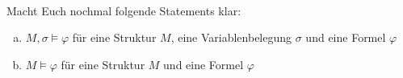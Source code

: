 \newcommand{\printpraesenzlsg}{false}
\newcommand{\printloesungen}{false}
\newcommand{\printbewertungen}{false}
\newcommand{\blattnummer}{3}



\iforiginal{}

	

\\
Macht Euch nochmal folgende Statements klar:
\begin{enumerate}[a)]
  \item $M,\sigma\models\varphi$ für eine Struktur $M$, eine Variablenbelegung $\sigma$ und eine Formel $\varphi$
  \item $M\models\varphi$ für eine Struktur $M$ und eine Formel $\varphi$
  
\end{enumerate}

